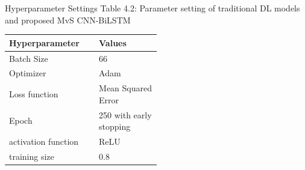 \documentclass[12pt, aspectratio=169]{beamer}
\begin{document}
\begin{frame}{Hyperparameter Settings}
	\centering
	\scriptsize {Table 4.2:  Parameter setting of traditional DL models and proposed
	MvS CNN-BiLSTM}\\
	\begin{table}
		\begin{tabular}{|p{0.2\linewidth}|p{0.3\linewidth}|}
			\hline
			\footnotesize \textbf{Hyperparameter} & \footnotesize \textbf{Values} \\ \hline
			Batch Size               & 66                     \\ \hline
			Optimizer                 & Adam                   \\ \hline
			Loss function            & Mean Squared Error      \\ \hline
			Epoch                    & 250 with early stopping \\ \hline
			activation function      & ReLU                   \\ \hline
			training size             & 0.8                   \\ \hline
		\end{tabular}
	\end{table}
\end{frame}



\end{document}
